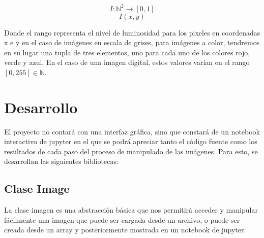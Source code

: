 \documentclass[letter]{article}
\begin{document}
$$ I:\mathbb N^2 \rightarrow [0, 1] $$
$$ I(x, y) $$

Donde el rango representa el nivel de luminosidad para los pixeles en
coordenadas x e y en el caso de imágenes en escala de grises, para imágenes a
color, tendremos en su lugar una tupla de tres elementos, uno para cada uno de
los colores rojo, verde y azul. En el caso de una imagen digital, estos valores
varían en el rango \([0,255]\in \mathbb N\).

\section{Desarrollo}
\label{sec:org1ea5792}
El proyecto no contará con una interfaz gráfica, sino que constará de un
notebook interactivo de jupyter en el que se podrá apreciar tanto el código
fuente como los resultados de cada paso del proceso de manipulado de las
imágenes. Para esto, se desarrollan las siguientes bibliotecas:

\subsection{Clase Image}
\label{sec:orgdc70db8}
La clase imagen es una abstracción básica que nos permitirá acceder y manipular
fácilmente una imagen que puede ser cargada desde un archivo, o puede ser creada
desde un array y posteriormente mostrada en un notebook de jupyter.
\end{document}
